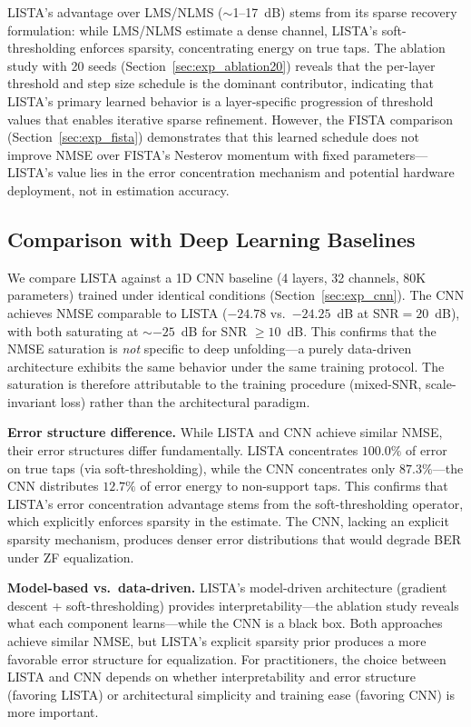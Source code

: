 \documentclass[a4paper,fleqn]{cas-sc}
\begin{document}
LISTA's advantage over LMS/NLMS ($\sim$1--17~dB) stems from its sparse recovery formulation: while LMS/NLMS estimate a dense channel, LISTA's soft-thresholding enforces sparsity, concentrating energy on true taps. The ablation study with 20 seeds (Section~\ref{sec:exp_ablation20}) reveals that the per-layer threshold and step size schedule is the dominant contributor, indicating that LISTA's primary learned behavior is a layer-specific progression of threshold values that enables iterative sparse refinement. However, the FISTA comparison (Section~\ref{sec:exp_fista}) demonstrates that this learned schedule does not improve NMSE over FISTA's Nesterov momentum with fixed parameters---LISTA's value lies in the error concentration mechanism and potential hardware deployment, not in estimation accuracy.

\subsection{Comparison with Deep Learning Baselines}\label{sec:dl_comparison}

We compare LISTA against a 1D CNN baseline (4 layers, 32 channels, $80$K parameters) trained under identical conditions (Section~\ref{sec:exp_cnn}). The CNN achieves NMSE comparable to LISTA ($-24.78$ vs.~$-24.25$~dB at SNR$=20$~dB), with both saturating at $\sim$$-25$~dB for SNR $\geq 10$~dB. This confirms that the NMSE saturation is \emph{not} specific to deep unfolding---a purely data-driven architecture exhibits the same behavior under the same training protocol. The saturation is therefore attributable to the training procedure (mixed-SNR, scale-invariant loss) rather than the architectural paradigm.

\textbf{Error structure difference.} While LISTA and CNN achieve similar NMSE, their error structures differ fundamentally. LISTA concentrates $100.0\%$ of error on true taps (via soft-thresholding), while the CNN concentrates only $87.3\%$---the CNN distributes $12.7\%$ of error energy to non-support taps. This confirms that LISTA's error concentration advantage stems from the soft-thresholding operator, which explicitly enforces sparsity in the estimate. The CNN, lacking an explicit sparsity mechanism, produces denser error distributions that would degrade BER under ZF equalization.

\textbf{Model-based vs.~data-driven.} LISTA's model-driven architecture (gradient descent + soft-thresholding) provides interpretability---the ablation study reveals what each component learns---while the CNN is a black box. Both approaches achieve similar NMSE, but LISTA's explicit sparsity prior produces a more favorable error structure for equalization. For practitioners, the choice between LISTA and CNN depends on whether interpretability and error structure (favoring LISTA) or architectural simplicity and training ease (favoring CNN) is more important.
\end{document}

